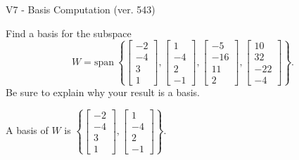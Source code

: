 \begin{exercise}
  \begin{exerciseTitle}V7 - Basis Computation (ver. 543)\end{exerciseTitle}
  \begin{exerciseStatement}
    Find a basis for the subspace 
\[W=\mathrm{span}\ \left\{\left[\begin{array}{r}
-2 \\
-4 \\
3 \\
1
\end{array}\right] , \left[\begin{array}{r}
1 \\
-4 \\
2 \\
-1
\end{array}\right] , \left[\begin{array}{r}
-5 \\
-16 \\
11 \\
2
\end{array}\right] , \left[\begin{array}{r}
10 \\
32 \\
-22 \\
-4
\end{array}\right]\right\}.\]
 Be sure to explain why your result is a basis.


  \end{exerciseStatement}
  \begin{exerciseAnswer}
   A basis of \(W\) is  \(\left\{\left[\begin{array}{r}
-2 \\
-4 \\
3 \\
1
\end{array}\right] , \left[\begin{array}{r}
1 \\
-4 \\
2 \\
-1
\end{array}\right]\right\}\).
  


  \end{exerciseAnswer}
\end{exercise}